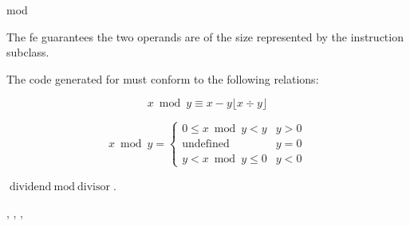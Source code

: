 \begin{instruction}{mod}

  \begin{notes}
    The \ac{fe} guarantees the two operands are of the size
    represented by the instruction subclass.

    The code generated for  must conform to the following
    relations:

    \[ x \bmod y \equiv x - y \lfloor {x \div y} \rfloor \]

    \[x \bmod y = \left\{
      \begin{array}{l|l}
        0 \leq x \bmod y < y & y > 0 \\
        \mbox{undefined} & y = 0 \\
        y < x \bmod y \leq 0 & y < 0
      \end{array}
      \right. \]
  \end{notes}

  \begin{results}
  \item $\textrm{dividend} \bmod \textrm{divisor}$.
  \end{results}

  \begin{operands}
  \item {}
  \item {}
  \end{operands}

  \begin{seealso}
    , ,
    , 
  \end{seealso}
\end{instruction}

